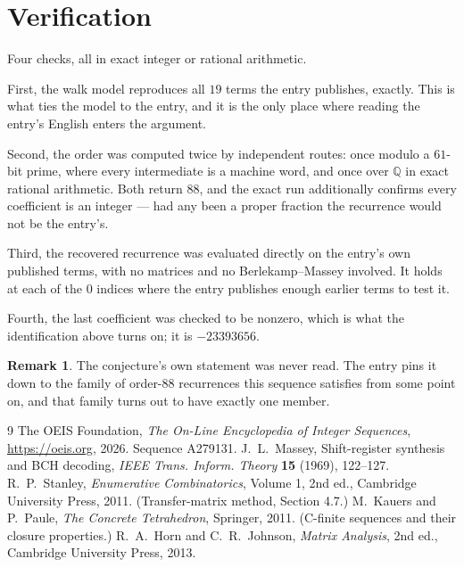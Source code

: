 \documentclass[11pt,a4paper]{article}
\theoremstyle{plain}
\theoremstyle{definition}
\newtheorem{remark}[theorem]{Remark}
\begin{document}
\section{Verification}

Four checks, all in exact integer or rational arithmetic.

First, the walk model reproduces all $19$ terms the entry publishes, exactly. This is
what ties the model to the entry, and it is the only place where reading the entry's English
enters the argument.

Second, the order was computed twice by independent routes: once modulo a $61$-bit prime, where
every intermediate is a machine word, and once over $\mathbb{Q}$ in exact rational arithmetic.
Both return $88$, and the exact run additionally confirms every coefficient is an integer
--- had any been a proper fraction the recurrence would not be the entry's.

Third, the recovered recurrence was evaluated directly on the entry's own published terms, with
no matrices and no Berlekamp--Massey involved. It holds at each of the $0$ indices where
the entry publishes enough earlier terms to test it.

Fourth, the last coefficient was checked to be nonzero, which is what the identification above
turns on; it is $-23393656$.

\begin{remark}
The conjecture's own statement was never read. The entry pins it down to the family of
order-$88$ recurrences this sequence satisfies from some point on, and that family turns
out to have exactly one member.
\end{remark}

\begin{thebibliography}{9}
 The OEIS Foundation, \emph{The On-Line Encyclopedia of Integer
Sequences}, \url{https://oeis.org}, 2026. Sequence A279131.
 J.~L.~Massey, Shift-register synthesis and BCH decoding, \emph{IEEE
Trans. Inform. Theory} \textbf{15} (1969), 122--127.
 R.~P.~Stanley, \emph{Enumerative Combinatorics}, Volume 1, 2nd ed.,
Cambridge University Press, 2011. (Transfer-matrix method, Section 4.7.)
 M.~Kauers and P.~Paule, \emph{The Concrete Tetrahedron}, Springer, 2011.
(C-finite sequences and their closure properties.)
 R.~A.~Horn and C.~R.~Johnson, \emph{Matrix Analysis}, 2nd ed., Cambridge
University Press, 2013.
\end{thebibliography}
\end{document}
